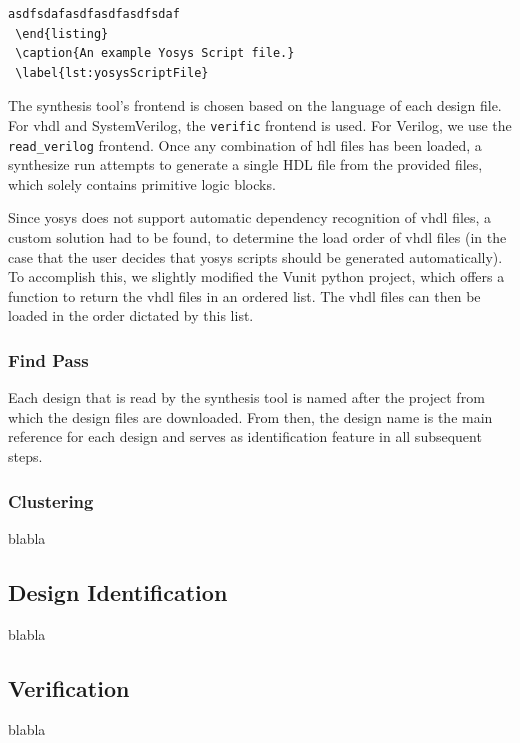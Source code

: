  \begin{lstlisting}[style = python, caption = {An example Yosys Script file.}, label = {lst:yosysScriptFile}]
  asdfsdafasdfasdfasdfsdaf
 \end{listing}
 \caption{An example Yosys Script file.}
 \label{lst:yosysScriptFile}
 \end{lstlisting}

The synthesis tool's frontend is chosen based on the language of each design file.
For \gls{vhdl} and SystemVerilog, the \lstinline{verific} frontend is used. For Verilog,
we use the \lstinline{read_verilog} frontend. Once any combination of \gls{hdl} files
has been loaded, a synthesize run attempts to generate a single HDL file from the provided
files, which solely contains primitive logic blocks. 

Since yosys does not support automatic dependency recognition of vhdl files, a custom solution
had to be found, to determine the load order of vhdl files (in the case that the user decides
that yosys scripts should be generated automatically). To accomplish this, we slightly modified 
the Vunit python project, which offers a function to return the \gls{vhdl} 
files in an ordered list. The vhdl files can then be loaded in the order dictated by this list.  

\subsubsection{Find Pass} 
Each design that is read by the synthesis tool is named after the project from
which the design files are downloaded. From then, the design name is the main
reference for each design and serves as identification feature in all
subsequent steps.

\subsubsection{Clustering}
blabla

\subsection{Design Identification}
blabla

\subsection{Verification}
blabla



